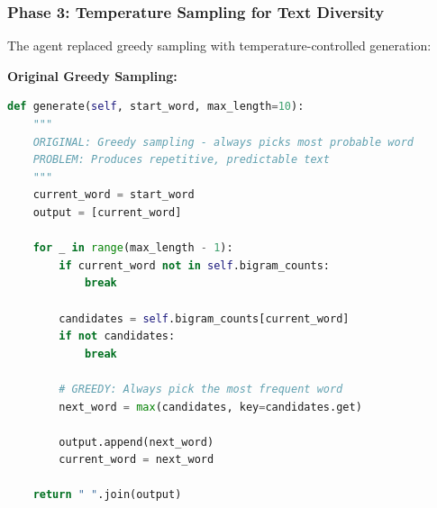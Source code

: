 \documentclass[12pt, a4paper]{article}
\begin{document}
\subsubsection{Phase 3: Temperature Sampling for Text Diversity}

The agent replaced greedy sampling with temperature-controlled generation:

\textbf{Original Greedy Sampling:}
\begin{lstlisting}[language=Python, caption=Original Greedy Sampling - Repetitive Output]
def generate(self, start_word, max_length=10):
    """
    ORIGINAL: Greedy sampling - always picks most probable word
    PROBLEM: Produces repetitive, predictable text
    """
    current_word = start_word
    output = [current_word]

    for _ in range(max_length - 1):
        if current_word not in self.bigram_counts:
            break

        candidates = self.bigram_counts[current_word]
        if not candidates:
            break
        
        # GREEDY: Always pick the most frequent word
        next_word = max(candidates, key=candidates.get)
        
        output.append(next_word)
        current_word = next_word

    return " ".join(output)
\end{lstlisting}
\end{document}
